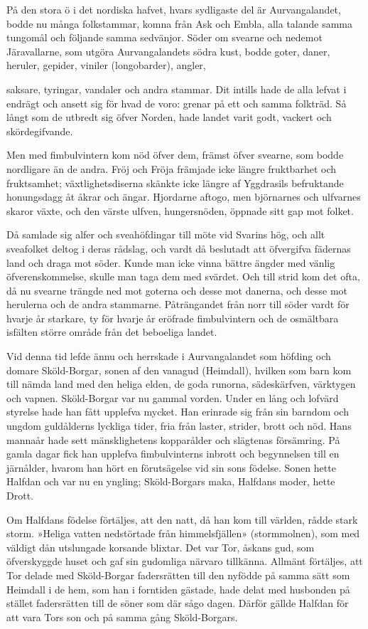 På den stora ö i det nordiska hafvet, hvars sydligaste del är
Aurvangalandet, bodde nu många folkstammar, komna från Ask och Embla,
alla talande samma tungomål och följande samma sedvänjor. Söder om
svearne och nedemot Järavallarne, som utgöra Aurvangalandets södra kust,
bodde goter, daner, heruler, gepider, viniler (longobarder), angler,

saksare, tyringar, vandaler och andra stammar. Dit intills hade de alla
lefvat i endrägt och ansett sig för hvad de voro: grenar på ett och
samma folkträd. Så långt som de utbredt sig öfver Norden, hade landet
varit godt, vackert och skördegifvande.

Men med fimbulvintern kom nöd öfver dem, främst öfver svearne, som bodde
nordligare än de andra. Fröj och Fröja främjade icke längre fruktbarhet
och fruktsamhet; växtlighetsdiserna skänkte icke längre af Yggdrasils
befruktande honungsdagg åt åkrar och ängar. Hjordarne aftogo, men
björnarnes och ulfvarnes skaror växte, och den värste ulfven,
hungersnöden, öppnade sitt gap mot folket.

Då samlade sig alfer och sveahöfdingar till möte vid Svarins hög, och
allt sveafolket deltog i deras rådslag, och vardt då beslutadt att
öfvergifva fädernas land och draga mot söder. Kunde man icke vinna
bättre ängder med vänlig öfverenskommelse, skulle man taga dem med
svärdet. Och till strid kom det ofta, då nu svearne trängde ned mot
goterna och desse mot danerna, och desse mot herulerna och de andra
stammarne. Påträngandet från norr till söder vardt för hvarje år
starkare, ty för hvarje år eröfrade fimbulvintern och de osmältbara
isfälten större område från det beboeliga landet.

Vid denna tid lefde ännu och herrskade i Aurvangalandet som höfding och
domare Sköld-Borgar, sonen af den vanagud (Heimdall), hvilken som barn
kom till nämda land med den heliga elden, de goda runorna, sädeskärfven,
värktygen och vapnen. Sköld-Borgar var nu gammal vorden. Under en lång
och lofvärd styrelse hade han fått upplefva mycket. Han erinrade sig
från sin barndom och ungdom guldålderns lyckliga tider, fria från
laster, strider, brott och nöd. Hans mannaår hade sett mänsklighetens
kopparålder och slägtenas försämring. På gamla dagar fick han upplefva
fimbulvinterns inbrott och begynnelsen till en järnålder, hvarom han
hört en förutsägelse vid sin sons födelse. Sonen hette Halfdan och var
nu en yngling; Sköld-Borgars maka, Halfdans moder, hette Drott.



Om Halfdans födelse förtäljes, att den natt, då han kom till världen,
rådde stark storm. »Heliga vatten nedstörtade från himmelsfjällen»
(stormmolnen), som med väldigt dån utslungade korsande blixtar. Det var
Tor, åskans gud, som öfverskyggde huset och gaf sin gudomliga närvaro
tillkänna. Allmänt förtäljes, att Tor delade med Sköld-Borgar
fadersrätten till den nyfödde på samma sätt som Heimdall i de hem, som
han i forntiden gästade, hade delat med husbonden på stället
fadersrätten till de söner som där sågo dagen. Därför gällde Halfdan för
att vara Tors son och på samma gång Sköld-Borgars.

